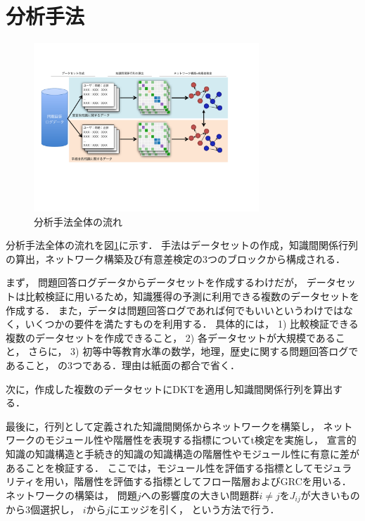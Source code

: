 \documentclass[twocolumn,a4j,10pt]{jsarticle}
\begin{document}
\section{分析手法}

\begin{figure}[tb]
\begin{center}
\includegraphics[width=240pt]{./img/method2.pdf}
\end{center}
\caption{分析手法全体の流れ}
\label{fig:method}
\end{figure}

分析手法全体の流れを図\ref{fig:method}に示す．
手法はデータセットの作成，知識間関係行列の算出，ネットワーク構築及び有意差検定の3つのブロックから構成される．

まず，
問題回答ログデータからデータセットを作成するわけだが，
データセットは比較検証に用いるため，知識獲得の予測に利用できる複数のデータセットを作成する．
また，データは問題回答ログであれば何でもいいというわけではなく，いくつかの要件を満たすものを利用する．
具体的には，
1) 比較検証できる複数のデータセットを作成できること，
2) 各データセットが大規模であること，
さらに，
3) 初等中等教育水準の数学，地理，歴史に関する問題回答ログであること，
の3つである．理由は紙面の都合で省く．

次に，作成した複数のデータセットにDKTを適用し知識間関係行列を算出する．

最後に，行列として定義された知識間関係からネットワークを構築し，
ネットワークのモジュール性や階層性を表現する指標についてt検定を実施し，
宣言的知識の知識構造と手続き的知識の知識構造の階層性やモジュール性に有意に差があることを検証する．
ここでは，モジュール性を評価する指標としてモジュラリティを用い，階層性を評価する指標としてフロー階層およびGRCを用いる．
ネットワークの構築は，
問題$j$への影響度の大きい問題群$i \neq j$を$J_{ij}$が大きいものから$3$個選択し，
$i$から$j$にエッジを引く，
という方法で行う．
\end{document}
